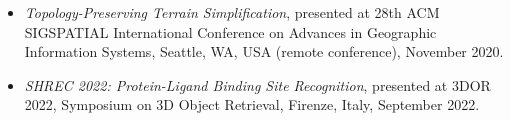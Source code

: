 \documentclass[11pt]{article}
\begin{document}
\begin{itemize}
\item {\em Topology-Preserving Terrain Simplification}, presented at 28th ACM SIGSPATIAL International Conference on Advances in Geographic Information Systems, Seattle, WA, USA (remote conference), November 2020.



\item {\em SHREC 2022: Protein-Ligand Binding Site Recognition}, presented at 3DOR 2022, Symposium on 3D Object Retrieval, Firenze, Italy, September 2022.

\end{itemize}
\end{document}
